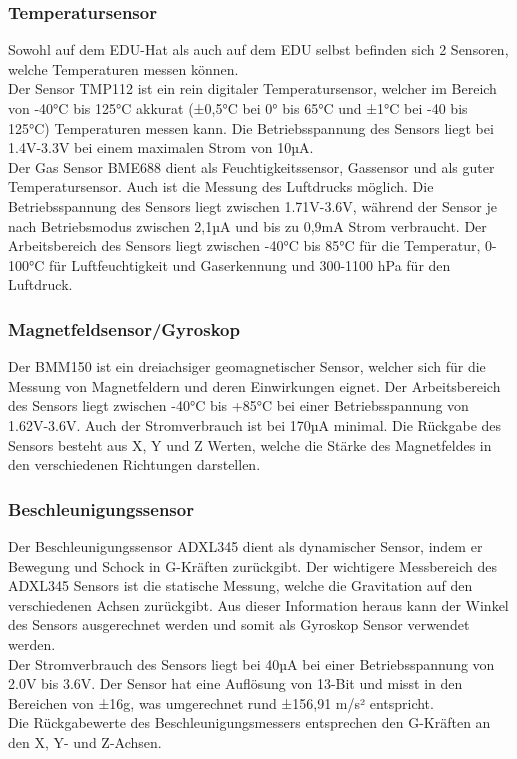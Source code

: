 \subsubsection{Temperatursensor}\label{temperatur}
Sowohl auf dem EDU-Hat als auch auf dem EDU selbst befinden sich 2 Sensoren, welche Temperaturen messen können. \\
\vspace{3mm}
Der Sensor TMP112\autocite{TMP112} ist ein rein digitaler Temperatursensor, welcher im Bereich von -40°C bis 125°C akkurat (±0,5°C bei 0° bis 65°C und ±1°C bei -40 bis 125°C) Temperaturen messen kann. Die Betriebsspannung des Sensors liegt bei 1.4V-3.3V bei einem maximalen Strom von 10µA. \\
\vspace{3mm}
Der Gas Sensor BME688\autocite{BME688} dient als Feuchtigkeitssensor, Gassensor und als guter Temperatursensor. Auch ist die Messung des Luftdrucks möglich. Die Betriebsspannung des Sensors liegt zwischen 1.71V-3.6V, während der Sensor je nach Betriebsmodus zwischen 2,1µA und bis zu 0,9mA Strom verbraucht. Der Arbeitsbereich des Sensors liegt zwischen -40°C bis 85°C für die Temperatur, 0-100°C für Luftfeuchtigkeit und Gaserkennung und 300-1100 hPa für den Luftdruck. 

\subsubsection{Magnetfeldsensor/Gyroskop}\label{magentsen}
Der BMM150\autocite{BMM150} ist ein dreiachsiger geomagnetischer Sensor, welcher sich für die Messung von Magnetfeldern und deren Einwirkungen eignet. Der Arbeitsbereich des Sensors liegt zwischen -40°C bis +85°C bei einer Betriebsspannung von 1.62V-3.6V. Auch der Stromverbrauch ist bei 170µA minimal. Die Rückgabe des Sensors besteht aus X, Y und Z Werten, welche die Stärke des Magnetfeldes in den verschiedenen Richtungen darstellen. 

\subsubsection{Beschleunigungssensor}\label{beschleuni}
Der Beschleunigungssensor ADXL345\autocite{ADXL345} dient als dynamischer Sensor, indem er Bewegung und Schock in G-Kräften zurückgibt. Der wichtigere Messbereich des ADXL345 Sensors ist die statische Messung, welche die Gravitation auf den verschiedenen Achsen zurückgibt. Aus dieser Information heraus kann der Winkel des Sensors ausgerechnet werden und somit als Gyroskop Sensor verwendet werden. \\
\vspace{3mm}
Der Stromverbrauch des Sensors liegt bei 40µA bei einer Betriebsspannung von 2.0V bis 3.6V. Der Sensor hat eine Auflösung von 13-Bit und misst in den Bereichen von ±16g, was umgerechnet rund ±156,91 m/s² entspricht. \\
\vspace{3mm}
Die Rückgabewerte des Beschleunigungsmessers entsprechen den G-Kräften an den X, Y- und Z-Achsen.


